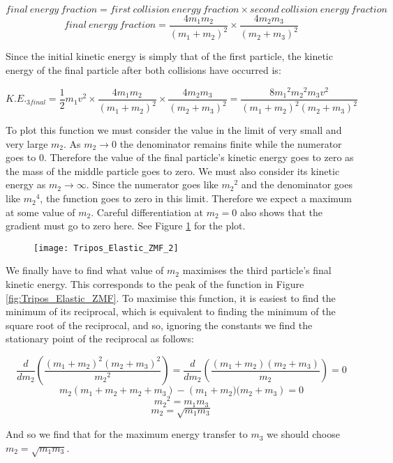 \begin{problem}
{\begin{equation*}final~energy~fraction=first~collision~energy~fraction \times second~collision~energy~fraction\end{equation*}
\begin{equation*}final~energy~fraction=\frac{4m_{1}m_{2}}{(m_{1}+m_{2})^{2}}\times \frac{4m_{2}m_{3}}{(m_{2}+m_{3})^{2}}\end{equation*}

Since the initial kinetic energy is simply that of the first particle, the kinetic energy of the final particle after both collisions have occurred is:

\begin{equation*}K.E._{3final}=\frac{1}{2}m_1v^2 \times \frac{4m_{1}m_{2}}{(m_{1}+m_{2})^{2}}\times \frac{4m_{2}m_{3}}{(m_{2}+m_{3})^{2}}=\frac{8{m_{1}}^2{m_{2}}^2m_3v^2}{(m_{1}+m_{2})^{2}(m_{2}+m_{3})^{2}}\end{equation*}

To plot this function we must consider the value in the limit of very small and very large $m_2$. As $m_2 \to 0$ the denominator remains finite while the numerator goes to 0. Therefore the value of the final particle's kinetic energy goes to zero as the mass of the middle particle goes to zero. We must also consider its kinetic energy as $m_2 \to \infty$. Since the numerator goes like ${m_2}^2$ and the denominator goes like ${m_2}^4$, the function goes to zero in this limit. Therefore we expect a maximum at some value of $m_2$. Careful differentiation at $m_2=0$ also shows that the gradient must go to zero here. See Figure \ref{fig:Tripos_Elastic_ZMF_2} for the plot. 

\begin{figure}[h]
	\centering
	\texttt{[image: Tripos\_Elastic\_ZMF\_2]}
	\caption{}
	\label{fig:Tripos_Elastic_ZMF_2}
\end{figure}

We finally have to find what value of $m_2$ maximises the third particle's final kinetic energy. This corresponds to the peak of the function in Figure \ref{fig:Tripos_Elastic_ZMF}. To maximise this function, it is easiest to find the minimum of its reciprocal, which is equivalent to finding the minimum of the square root of the reciprocal, and so, ignoring the constants we find the stationary point of the reciprocal as follows:

\begin{equation*}\frac{d}{d{m_2}}\left(\frac{(m_{1}+m_{2})^{2}(m_{2}+m_{3})^{2}}{{m_{2}}^2}
\right)=\frac{d}{d{m_2}}\left(\frac{(m_{1}+m_{2})(m_{2}+m_{3})}{{m_{2}}}
\right)=0\end{equation*}
\begin{equation*}m_2\left(m_1 + m_2 + m_2 +m_3\right)-\left(m_{1}+m_{2})(m_{2}+m_{3}
\right)=0\end{equation*}
\begin{equation*}{m_2}^2=m_1m_3\end{equation*}
\begin{equation*}m_2=\sqrt{m_1m_3}\end{equation*}

And so we find that for the maximum energy transfer to $m_3$ we should choose $m_2=\sqrt{m_1m_3}$.
}
\end{problem}
%